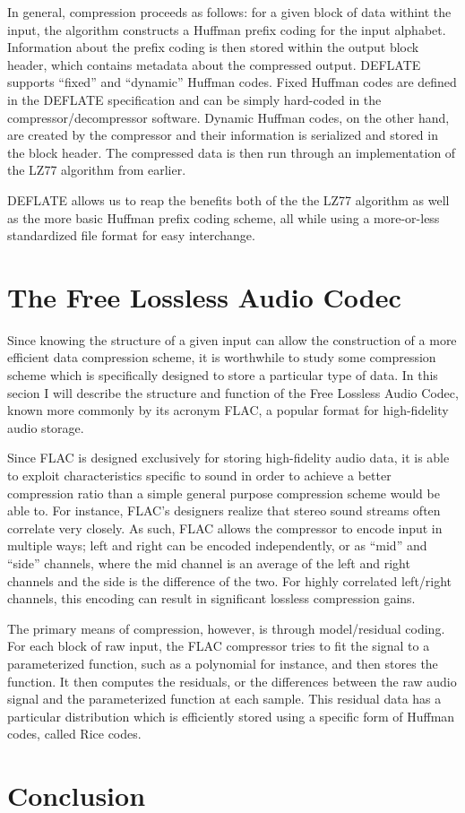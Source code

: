 \documentclass[12pt]{article}
\begin{document}
In general, compression proceeds as follows: for a given block of data
withint the input, the algorithm constructs a Huffman prefix coding
for the input alphabet. Information about the prefix coding is then
stored within the output block header, which contains metadata about the
compressed output. DEFLATE supports ``fixed'' and ``dynamic'' Huffman
codes. Fixed Huffman codes are defined in the DEFLATE specification
and can be simply hard-coded in the compressor/decompressor
software. Dynamic Huffman codes, on the other hand, are created by the
compressor and their information is serialized and stored in the block
header. The compressed data is then run through an implementation of
the LZ77 algorithm from earlier.

DEFLATE allows us to reap the benefits both of the the LZ77 algorithm
as well as the more basic Huffman prefix coding scheme, all while
using a more-or-less standardized file format for easy interchange.

\section{The Free Lossless Audio Codec}

Since knowing the structure of a given input can allow the
construction of a more efficient data compression scheme, it is
worthwhile to study some compression scheme which is specifically
designed to store a particular type of data. In this secion I will
describe the structure and function of the Free Lossless Audio Codec,
known more commonly by its acronym FLAC, a popular format for
high-fidelity audio storage. \cite{flac}

Since FLAC is designed exclusively for storing high-fidelity audio
data, it is able to exploit characteristics specific to sound in order
to achieve a better compression ratio than a simple general purpose
compression scheme would be able to. For instance, FLAC's designers
realize that stereo sound streams often correlate very closely. As
such, FLAC allows the compressor to encode input in multiple ways;
left and right can be encoded independently, or as ``mid'' and
``side'' channels, where the mid channel is an average of the left and
right channels and the side is the difference of the two. For highly
correlated left/right channels, this encoding can result in
significant lossless compression gains.

The primary means of compression, however, is through model/residual
coding. For each block of raw input, the FLAC compressor tries to fit
the signal to a parameterized function, such as a polynomial for
instance, and then stores the function. It then computes the
residuals, or the differences between the raw audio signal and the
parameterized function at each sample. This residual data has a
particular distribution which is efficiently stored using a specific
form of Huffman codes, called Rice codes. \cite{flac}



\section{Conclusion}



\end{document}
